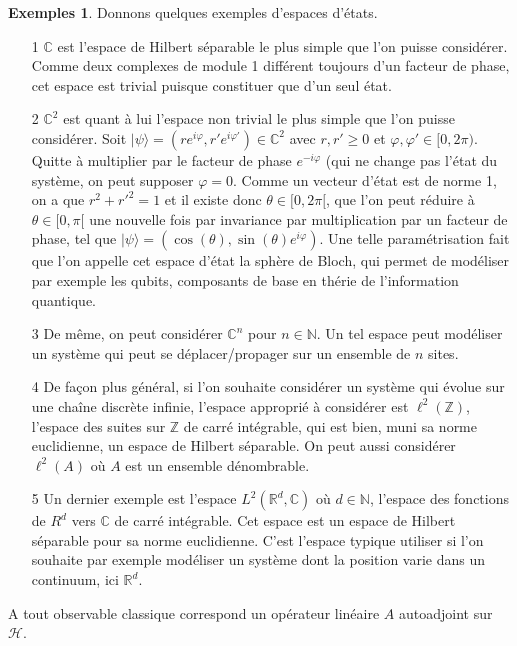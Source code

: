 \documentclass[12pt,openany,a4paper, titlepage]{article}
\newcommand{\lp}{\left(}
\newcommand{\rp}{\right)}
\newcommand{\R}{\mathbb{R}}
\newcommand{\C}{\mathbb{C}}
\newcommand{\Z}{\mathbb{Z}}
\newcommand{\N}{\mathbb{N}}
\newcommand{\HH}{\mathcal{H}}
\newcommand{\vp}{\varphi}
\theoremstyle{definition}
\theoremstyle{definition}
\theoremstyle{definition}
\theoremstyle{definition}
\newtheorem{exs}{Exemples}
\theoremstyle{definition}
\theoremstyle{definition}
\begin{document}
\begin{exs}
    Donnons quelques exemples d'espaces d'états.
    \begin{enumerate}
        \item[1] $\C$ est l'espace de Hilbert séparable le plus simple que l'on puisse considérer. Comme deux complexes de module 1 différent toujours d'un facteur de phase, cet espace est trivial puisque constituer que d'un seul état.
        \item[2] $\C^2$ est quant à lui l'espace non trivial le plus simple que l'on puisse considérer. Soit $|\psi\rangle = (re^{i\vp}, r'e^{i\vp'}) \in \C^2$ avec $r,r'\geq 0$ et $\vp, \vp' \in [0,2\pi)$. Quitte à multiplier par le facteur de phase $e^{-i\vp}$ (qui ne change pas l'état du système, on peut supposer $\vp = 0$. Comme un vecteur d'état est de norme 1, on a que $r^2 + r'^2 = 1$ et il existe donc $\theta \in [0,2\pi[$, que l'on peut réduire à $\theta \in [0,\pi[$ une nouvelle fois par invariance par multiplication par un facteur de phase, tel que $|\psi\rangle = \lp \cos(\theta), \sin(\theta)e^{i\vp}\rp$. Une telle paramétrisation fait que l'on appelle cet espace d'état la sphère de Bloch, qui permet de modéliser par exemple les qubits, composants de base en thérie de l'information quantique.
        \item[3] De même, on peut considérer $\C^n$ pour $n\in\N$. Un tel espace peut modéliser un système qui peut se déplacer/propager sur un ensemble de $n$ sites.
        \item[4]  De façon plus général, si l'on souhaite considérer un système qui évolue sur une chaîne discrète infinie, l'espace approprié à considérer est $\ell^2(\Z)$, l'espace des suites sur $\Z$ de carré intégrable, qui est bien, muni sa norme euclidienne, un espace de Hilbert séparable. On peut aussi considérer $\ell^2(A)$ où $A$ est un ensemble dénombrable.
        \item[5] Un dernier exemple est l'espace $L^2(\R^d,\C)$ où $d\in\N$, l'espace des fonctions de $R^d$ vers $\C$ de carré intégrable. Cet espace est un espace de Hilbert séparable pour sa norme euclidienne. C'est l'espace typique utiliser si l'on souhaite par exemple modéliser un système dont la position varie dans un continuum, ici $\R^d$.
    \end{enumerate}
\end{exs}

\vspace{3mm}
\begin{tcolorbox}[colback=gray!5!white,
                  colframe=gray!80!white,
                  title= Postulat 2 : Principe de correspondance ]
A tout observable classique correspond un opérateur linéaire $A$ autoadjoint sur $\HH$.
\end{tcolorbox}
\vspace{3mm}
\end{document}
